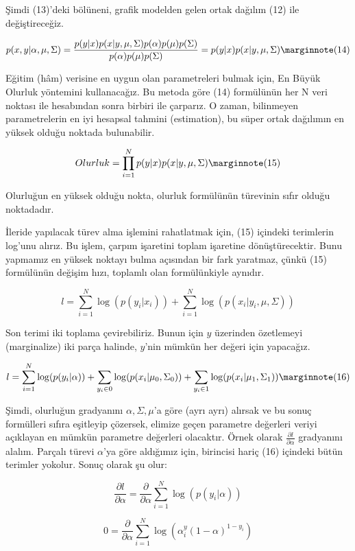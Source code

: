 \documentclass[12pt,fleqn]{article}\usepackage{../../common}
\begin{document}
Şimdi (13)'deki bölüneni, grafik modelden gelen ortak dağılım (12) ile
değiştireceğiz.

$$
p(x,y|\alpha,\mu,\Sigma) =
\frac{p(y|x)p(x|y,\mu,\Sigma)p(\alpha)p(\mu)p(\Sigma)}
     {p(\alpha)p(\mu)p(\Sigma)} \nonumber \\
= p(y|x)p(x|y,\mu,\Sigma) 
\mlabel{14}
$$

Eğitim (hâm) verisine en uygun olan parametreleri bulmak için, En Büyük
Olurluk yöntemini kullanacağız. Bu metoda göre (14) formülünün her N veri
noktası ile hesabından sonra birbiri ile çarparız. O zaman, bilinmeyen
parametrelerin en iyi hesapsal tahmini (estimation), bu süper ortak
dağılımın en yüksek olduğu noktada bulunabilir.

$$
Olurluk = \prod_{i=1}^N p(y|x)p(x|y,\mu,\Sigma)
\mlabel{15}
$$

Olurluğun en yüksek olduğu nokta, olurluk formülünün türevinin sıfır olduğu
noktadadır.

İleride yapılacak türev alma işlemini rahatlatmak için, (15) içindeki
terimlerin log'unu alırız. Bu işlem, çarpım işaretini toplam işaretine
dönüştürecektir. Bunu yapmamız en yüksek noktayı bulma açısından bir fark
yaratmaz, çünkü (15) formülünün değişim hızı, toplamlı olan formülünkiyle
aynıdır.

$$
l = \sum_{i=1}^N \log (p(y_{i}|x_{i})) + \sum_{i=1}^N \log
(p(x_{i}|y_{i},\mu,\Sigma))
$$

Son terimi iki toplama çevirebiliriz. Bunun için $y$ üzerinden özetlemeyi
(marginalize) iki parça halinde, $y$'nin mümkün her değeri için yapacağız.

$$
l = \sum_{i=1}^N \log(p(y_{i}|\alpha)) + 
\sum_{y_{i}\in 0} \log(p(x_{i}|\mu_{0},\Sigma_{0})) + 
\sum_{y_{i}\in 1} \log(p(x_{i}|\mu_{1},\Sigma_{1}))
\mlabel{16}
$$

Şimdi, olurluğun gradyanını $\alpha, \Sigma, \mu$'a göre (ayrı ayrı)
alırsak ve bu sonuç formülleri sıfıra eşitleyip çözersek, elimize geçen
parametre değerleri veriyi açıklayan en mümkün parametre değerleri
olacaktır. Örnek olarak $\frac{\partial l}{\partial \alpha}$ gradyanını
alalım. Parçalı türevi $\alpha$'ya göre aldığımız için, birincisi hariç
(16) içindeki bütün terimler yokolur. Sonuç olarak şu olur:

$$ 
  \frac{\partial l}{\partial \alpha} =
  \frac{\partial }{\partial \alpha}
  \sum_{i=1}^N \log (p(y_{i}|\alpha)) 
$$

$$ 
  0 =
  \frac{\partial}{\partial \alpha}
  \sum_{i=1}^N \log\left(\alpha^y_{i}(1-\alpha)^{1-y_{i}}\right) 
$$
\end{document}
